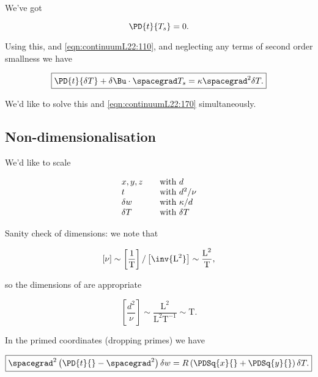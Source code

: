 We've got

\begin{equation}\label{eqn:continuumL22:210}
\PD{t}{T_s} = 0.
\end{equation}

Using this, and \ref{eqn:continuumL22:110}, and neglecting any terms of second order smallness we have

\begin{equation}\label{eqn:continuumL22:230}
\boxed{
\PD{t}{\delta T} + \delta \Bu \cdot \spacegrad T_s = \kappa \spacegrad^2 \delta T.
}
\end{equation}

We'd like to solve this and \ref{eqn:continuumL22:170} simultaneously.

\subsection{Non-dimensionalisation}

We'd like to scale

\begin{equation}\label{eqn:continuumL22:250}
\begin{array}{l l}
x,y,z & \quad \mbox{with $d$} \\
t & \quad \mbox{with $d^2/\nu$} \\
\delta w & \quad \mbox{with $\kappa/d$} \\
\delta T & \quad \mbox{with $\delta T$}
\end{array}
\end{equation}

Sanity check of dimensions: we note that

\begin{equation}\label{eqn:continuumL22:270}
[\nu] \sim \left[ \frac{1}{\text{T}} \right]/ \left[\inv{\text{L}^2} \right] \sim \frac{\text{L}^2}{\text{T}},
\end{equation}

so the dimensions of are appropriate

\begin{equation}\label{eqn:continuumL22:290}
\left[\frac{d^2}{\nu}\right] \sim \frac{\text{L}^2}{\text{L}^2 \text{T}^{-1}} \sim \text{T}.
\end{equation}

In the primed coordinates (dropping primes) we have

\begin{equation}\label{eqn:continuumL22:310}
\boxed{
\spacegrad^2 \left( 
\PD{t}{} - \spacegrad^2 
\right)
\delta w
=
R \left( 
\PDSq{x}{}
+\PDSq{y}{}
\right) \delta T.
}
\end{equation}

